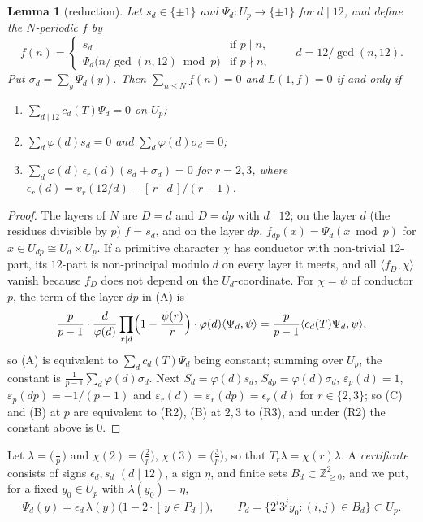 \documentclass[11pt,a4paper]{article}
\newtheorem{lemma}[theorem]{Lemma}
\theoremstyle{definition}
\theoremstyle{remark}
\newcommand{\Z}{\mathbb{Z}}
\newcommand{\ip}[2]{\langle #1,#2\rangle}
\begin{document}
\begin{lemma}[reduction]\label{lem:red12}
Let $s_d\in\{\pm1\}$ and $\Psi_d\colon U_p\to\{\pm1\}$ for $d\mid 12$, and define the $N$-periodic $f$ by
\[
f(n)=\begin{cases}s_{d}&\text{if }p\mid n,\\ \Psi_{d}\bigl(n/\gcd(n,12)\bmod p\bigr)&\text{if }p\nmid n,\end{cases}\qquad d=12/\gcd(n,12).
\]
Put $\sigma_d=\sum_y\Psi_d(y)$. Then $\sum_{n\le N}f(n)=0$ and $L(1,f)=0$ if and only if
\begin{enumerate}
\item[\textup{(R1)}] $\sum_{d\mid12}c_d(T)\Psi_d=0$ on $U_p$;
\item[\textup{(R2)}] $\sum_{d}\varphi(d)s_d=0$ and $\sum_d\varphi(d)\sigma_d=0$;
\item[\textup{(R3)}] $\sum_d\varphi(d)\,\epsilon_r(d)(s_d+\sigma_d)=0$ for $r=2,3$, where $\epsilon_r(d)=v_r(12/d)-[\,r\mid d\,]/(r-1)$.
\end{enumerate}
\end{lemma}

\begin{proof}
The layers of $N$ are $D=d$ and $D=dp$ with $d\mid12$; on the layer $d$ (the residues divisible by $p$) $f=s_d$, and on the layer $dp$, $f_{dp}(x)=\Psi_d(x\bmod p)$ for $x\in U_{dp}\cong U_d\times U_p$. If a primitive character $\chi$ has conductor with non-trivial $12$-part, its $12$-part is non-principal modulo $d$ on every layer it meets, and all $\ip{f_D}{\chi}$ vanish because $f_D$ does not depend on the $U_d$-coordinate. For $\chi=\psi$ of conductor $p$, the term of the layer $dp$ in (A) is
\[
\frac{p}{p-1}\cdot\frac{d}{\varphi(d)}\prod_{r\mid d}\Bigl(1-\frac{\psi(r)}r\Bigr)\cdot\varphi(d)\ip{\Psi_d}{\psi}=\frac p{p-1}\ip{c_d(T)\Psi_d}{\psi},
\]
so (A) is equivalent to $\sum_dc_d(T)\Psi_d$ being constant; summing over $U_p$, the constant is $\frac1{p-1}\sum_d\varphi(d)\sigma_d$. Next $S_d=\varphi(d)s_d$, $S_{dp}=\varphi(d)\sigma_d$, $\varepsilon_p(d)=1$, $\varepsilon_p(dp)=-1/(p-1)$ and $\varepsilon_r(d)=\varepsilon_r(dp)=\epsilon_r(d)$ for $r\in\{2,3\}$; so (C) and (B) at $p$ are equivalent to (R2), (B) at $2,3$ to (R3), and under (R2) the constant above is $0$.
\end{proof}

Let $\lambda=\bigl(\frac{\cdot}{p}\bigr)$ and $\chi(2)=\bigl(\frac2p\bigr)$, $\chi(3)=\bigl(\frac3p\bigr)$, so that $T_r\lambda=\chi(r)\lambda$. A \emph{certificate} consists of signs $\epsilon_d,s_d$ $(d\mid12)$, a sign $\eta$, and finite sets $B_d\subset\Z_{\ge0}^2$, and we put, for a fixed $y_0\in U_p$ with $\lambda(y_0)=\eta$,
\begin{equation}\label{eq:Psi}
\Psi_d(y)=\epsilon_d\,\lambda(y)\bigl(1-2\cdot[\,y\in P_d\,]\bigr),\qquad P_d=\{2^i3^jy_0:(i,j)\in B_d\}\subset U_p .
\end{equation}
\end{document}
